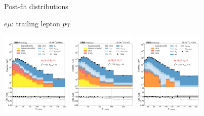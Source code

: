 \begin{frame}{Post-fit distributions}
\begin{tcolorbox}{$e\mu$: trailing lepton $p_{\mathrm{T}}$}
\begin{center}
            \includegraphics[width=0.25\textwidth]{chapters/Analysis/sectionStatisticalAnalysis/figures/fit/emu_cat_gt2_eq0}
            \includegraphics[width=0.25\textwidth]{chapters/Analysis/sectionStatisticalAnalysis/figures/fit/emu_cat_gt2_eq1_a}
            \includegraphics[width=0.25\textwidth]{chapters/Analysis/sectionStatisticalAnalysis/figures/fit/emu_cat_gt2_gt2_a}
        \end{center}
    \end{tcolorbox}

\end{frame}

